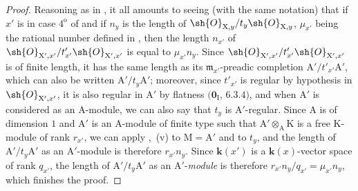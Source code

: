 \begin{proof}
Reasoning as in , it all amounts to seeing (with the same notation) that if $x'$ is in case $4^{\mathrm{o}}$ of  and if $n_y$ is the length of $\sh{O}_{\mathrm{X},y}/t_y\sh{O}_{\mathrm{X},y}$, $\mu_{x'}$ being the rational number defined in , then the length $n_{x'}$ of $\sh{O}_{\mathrm{X}',x'}/t'_{x'}\sh{O}_{\mathrm{X}',x'}$ is equal to $\mu_{x'}n_y$.
Since $\sh{O}_{\mathrm{X}',x'}/t'_{x'}\sh{O}_{\mathrm{X}',x'}$ is of finite length, it has the same length as its $\mathfrak{m}_{x'}$-preadic completion $\mathrm{A}'/t'_{x'}\mathrm{A}'$, which can also be written $\mathrm{A}'/t_y\mathrm{A}'$; moreover, since $t'_{x'}$ is regular by hypothesis in $\sh{O}_{\mathrm{X}',x'}$, it is also regular in $\mathrm{A}'$ by flatness $(\mathbf{0}_{\mathrm{I}}$, $6.3.4)$, and when $\mathrm{A}'$ is considered as an A-module, we can also say that $t_y$ is $\mathrm{A}'$-regular.
Since $\mathrm{A}$ is of dimension $1$ and $\mathrm{A}'$ is an A-module of finite type such that $\mathrm{A}'\otimes_{\mathrm{A}}\mathrm{K}$ is a free $\mathrm{K}$-module of rank $r_{x'}$, we can apply ,~(v) to $\mathrm{M}=\mathrm{A}'$ and to $t_y$, and the length of $\mathrm{A}'/t_y\mathrm{A}'$ as an $\mathrm{A}'$-module is therefore $r_{x'}n_y$.
Since $\boldsymbol{k}(x')$ is a $\boldsymbol{k}(x)$-vector space of rank $q_{x'}$, the length of $\mathrm{A}'/t_y\mathrm{A}'$ as an $\mathrm{A}'$-\emph{module} is therefore $r_{x'}n_y/q_{x'}=\mu_{x'}n_y$, which finishes the proof.
\end{proof}


